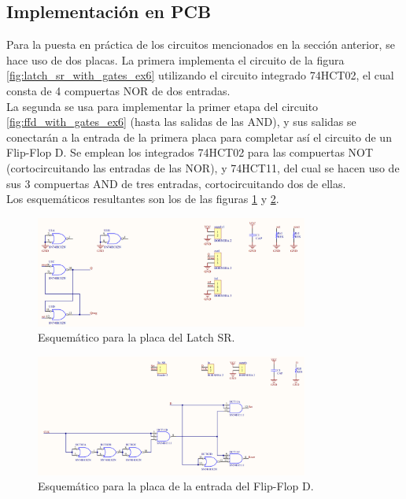 \subsection{Implementación en PCB}
Para la puesta en práctica de los circuitos mencionados en la sección anterior, se hace uso de dos placas.
La primera implementa el circuito de la figura \ref{fig:latch_sr_with_gates_ex6} utilizando el circuito integrado 74HCT02, el cual consta de 4 compuertas NOR de dos entradas. \\
La segunda se usa para implementar la primer etapa del circuito \ref{fig:ffd_with_gates_ex6} (hasta las salidas de las AND), y sus salidas se conectarán a la entrada 
de la primera placa para completar así el circuito de un Flip-Flop D.
Se emplean los integrados 74HCT02 para las compuertas NOT (cortocircuitando las entradas de las NOR), y 74HCT11, del cual se hacen uso de sus 3 compuertas AND de tres 
entradas, cortocircuitando dos de ellas.\\
Los esquemáticos resultantes son los de las figuras \ref{fig:latch_sr_schematic_ex6} y \ref{fig:ffd_adapter_schematic_ex6}.

\begin{figure}[H]
    \centering
    \includegraphics[width=0.8\textwidth]{../EJ6/Recursos/latch_sr_schematic}
    \caption{Esquemático para la placa del Latch SR.}
    \label{fig:latch_sr_schematic_ex6}
\end{figure}

\begin{figure}[H]
    \centering
    \includegraphics[width=0.8\textwidth]{../EJ6/Recursos/ffd_adapter_schematic}
    \caption{Esquemático para la placa de la entrada del Flip-Flop D.}
    \label{fig:ffd_adapter_schematic_ex6}
\end{figure}



